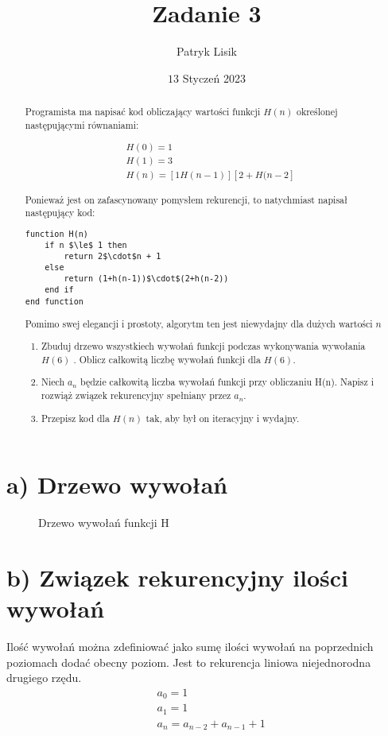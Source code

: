 \documentclass[12pt]{article}
\title{Zadanie 3}
\author{Patryk Lisik}
\date{\(13\) Styczeń  2023}
\begin{document}
\markboth{\theauthor}{\thetitle}

\maketitle


\begin{abstract}
Programista ma napisać kod obliczający wartości funkcji $H(n)$ określonej następującymi równaniami:

\begin{align*}
&H(0)=1 \\
&H(1)=3 \\
&H(n) = [1 H(n-1)][2+H(n-2]
\end{align*}

Ponieważ jest on zafascynowany pomysłem rekurencji, to natychmiast napisał następujący kod:
\begin{lstlisting}[mathescape=true]
function H(n)
    if n $\le$ 1 then
        return 2$\cdot$n + 1
    else
        return (1+h(n-1))$\cdot$(2+h(n-2))
    end if
end function
\end{lstlisting}

Pomimo swej elegancji i prostoty, algorytm ten jest niewydajny
dla dużych wartości $n$
\begin{enumerate}[label=(\alph*)]
    \item Zbuduj drzewo wszystkiech wywołań funkcji podczas wykonywania wywołania $H(6)$ .
    Oblicz całkowitą liczbę wywołań funkcji dla $H(6)$.
    \item Niech $a_n$ będzie całkowitą liczba wywołań funkcji przy obliczaniu H(n).
    Napisz i rozwiąż związek rekurencyjny spełniany przez $a_n$.
    \item Przepisz kod dla $H(n)$ tak, aby był on iteracyjny i wydajny.
\end{enumerate}
\end{abstract}


\section*{a) Drzewo wywołań}
\begin{figure}[H]
    
  \caption{Drzewo wywołań funkcji H}
  \label{fig:tikz:H}
\end{figure}

\section*{b) Związek rekurencyjny ilości wywołań}
Ilość wywołań można zdefiniować jako sumę ilości wywołań na poprzednich poziomach dodać obecny poziom. 
Jest to rekurencja liniowa niejednorodna drugiego rzędu. 
\begin{align*}
&a_0 = 1\\
&a_1 = 1 \\
&a_n = a_{n-2}+a_{n-1}+1
\label{eq:recursion}
\end{align*}
\end{document}
